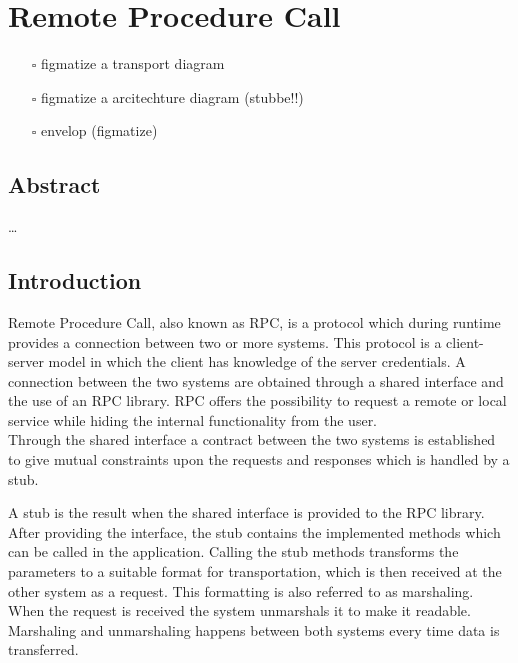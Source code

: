 \documentclass[
]{article}
\author{}
\date{}
\providecommand{\tightlist}{%
  \setlength{\itemsep}{0pt}\setlength{\parskip}{0pt}}
\begin{document}
\hypertarget{remote-procedure-call}{%
\section{Remote Procedure Call}\label{remote-procedure-call}}

\begin{itemize}
\tightlist
\item[$\square$]
  figmatize a transport diagram
\item[$\square$]
  figmatize a arcitechture diagram (stubbe!!)
\item[$\square$]
  envelop (figmatize)
\end{itemize}

\hypertarget{abstract}{%
\subsection{Abstract}\label{abstract}}

\ldots{}

\hypertarget{introduction}{%
\subsection{Introduction}\label{introduction}}

Remote Procedure Call, also known as RPC, is a protocol which during
runtime provides a connection between two or more systems. This protocol
is a client-server model in which the client has knowledge of the server
credentials. A connection between the two systems are obtained through a
shared interface and the use of an RPC library. RPC offers the
possibility to request a remote or local service while hiding the
internal functionality from the user.\\
Through the shared interface a contract between the two systems is
established to give mutual constraints upon the requests and responses
which is handled by a stub.

A stub is the result when the shared interface is provided to the RPC
library. After providing the interface, the stub contains the
implemented methods which can be called in the application. Calling the
stub methods transforms the parameters to a suitable format for
transportation, which is then received at the other system as a request.
This formatting is also referred to as marshaling. When the request is
received the system unmarshals it to make it readable. Marshaling and
unmarshaling happens between both systems every time data is
transferred.
\end{document}
